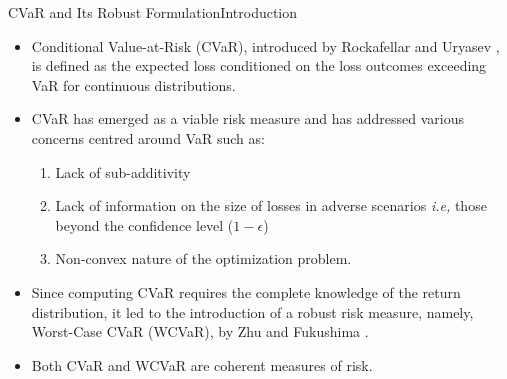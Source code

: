 \documentclass{beamer}
\begin{document}
\begin{frame}{CVaR and Its Robust Formulation}{Introduction}

\begin{itemize}
    \item{Conditional Value-at-Risk (CVaR), introduced by Rockafellar and Uryasev \cite{rockafellar1}, is defined as the expected loss conditioned on the loss outcomes exceeding VaR for continuous distributions.}
    \item{ CVaR has emerged as a viable risk measure and has addressed various concerns centred around VaR such as:
    \begin{enumerate}
        \item Lack of sub-additivity
        \item Lack of information on the size of losses in adverse scenarios \textit{i.e,} those beyond the confidence level ($1-\epsilon$)
        \item Non-convex nature of the optimization problem.
    \end{enumerate}
    }
    \item{Since computing CVaR requires the complete knowledge of the return distribution, it led to the introduction of a robust risk measure, namely, Worst-Case CVaR (WCVaR), by Zhu and Fukushima \cite{zhu}.}
    \item{Both CVaR and WCVaR are coherent measures of risk.}
\end{itemize}

\end{frame}
\end{document}
